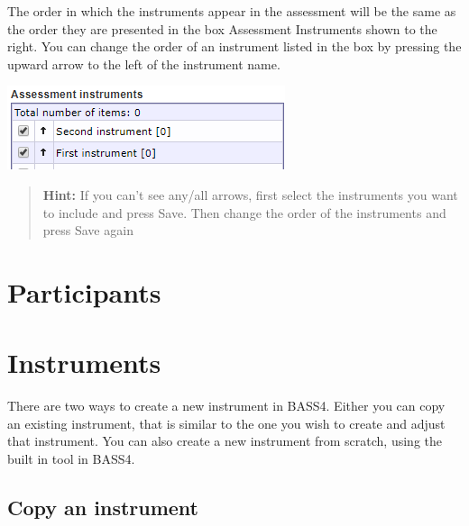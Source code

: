 \documentclass[]{book}
\begin{document}
The order in which the instruments appear in the assessment will be the same as the order they are presented in the box Assessment Instruments shown to the right. You can change the order of an instrument listed in the box by pressing the upward arrow to the left of the instrument name.

\includegraphics{images/assessment-instrument.png}

\begin{quote}
\textbf{Hint:} If you can't see any/all arrows, first select the instruments you want to include and press Save. Then change the order of the instruments and press Save again
\end{quote}

\hypertarget{participants}{%
\chapter{Participants}\label{participants}}

\hypertarget{instruments}{%
\chapter{Instruments}\label{instruments}}

There are two ways to create a new instrument in BASS4. Either you can copy an existing instrument, that is similar to the one you wish to create and adjust that instrument. You can also create a new instrument from scratch, using the built in tool in BASS4.

\hypertarget{copy-an-instrument}{%
\section{Copy an instrument}\label{copy-an-instrument}}
\end{document}
